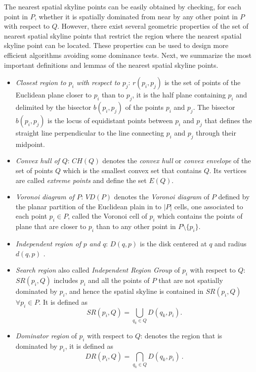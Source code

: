 \documentclass[11pt,onecolumn]{elsart3p}
\begin{document}
        The nearest spatial skyline points can be easily obtained by checking, for each point in $P$, whether it is spatially dominated from near by any other point in $P$ with respect to $Q$. However, there exist several geometric properties of the set of nearest spatial skyline points that restrict the region where the nearest spatial skyline point can be located. These properties can be used to design more efficient algorithms avoiding some dominance tests. Next, we summarize the most important definitions and lemmas of the nearest spatial skyline points. \\
        \begin{itemize}
        \item {\it Closest region to $p_i$ with respect to $p_j$}: $r(p_i,p_j)$ is the set of points of the Euclidean plane closer to $p_i$ than to $p_j$, it is the half plane containing $p_i$ and delimited by the bisector $b(p_i, p_j)$ of the points $p_i$ and $p_j$. The bisector $b(p_i,p_j)$ is the locus of equidistant points between $p_i$ and $p_j$ that defines the straight line perpendicular to the line connecting $p_i$ and $p_j$ through their midpoint. \vspace{0.6em}

        \item {\it Convex hull of $Q$}: $CH(Q)$ denotes the {\it convex hull} or {\it convex envelope} of the set of points $Q$ which is the smallest convex set that contains $Q$. Its vertices are called {\it extreme points} and define the set $E(Q)$.\vspace{0.6em}

        \item {\it Voronoi diagram of $P$}: $VD(P)$ denotes the {\it Voronoi diagram} of $P$ defined by the planar partition of the Euclidean plain in to $|P|$ cells, one associated to each point $p_i\in P$, called the Voronoi cell of $p_i$ which contains the points of plane that are closer to $p_i$ than to any other point in $P\setminus \{p_i\}$. \vspace{0.6em}

        \item {\it Independent region of $p$ and $q$}: $D(q,p)$ is the disk centered at $q$ and radius $d(q,p)$ \cite{WZSK17}. \vspace{0.6em}

        \item {\it Search region} also called {\it Independent Region Group} of $p_i$ with respect to $Q$: $SR(p_i,Q)$ includes $p_i$ and all the points of $P$ that are not spatially dominated by $p_i$, and hence the spatial skyline is contained in $SR(p_i,Q)$  $\forall p_i\in P$. It is defined as $$SR(p_i,Q) = \bigcup_{q_k \in Q} D(q_k, p_i).$$

        \item {\it Dominator region} of $p_i$ with respect to $Q$: denotes  the region that is dominated by $p_i$, it is defined as
            $$DR(p_i,Q)=\bigcap_{q_k \in Q} D(q_k, p_i) \, .$$\vspace{0.6em}
        \end{itemize}
\end{document}
